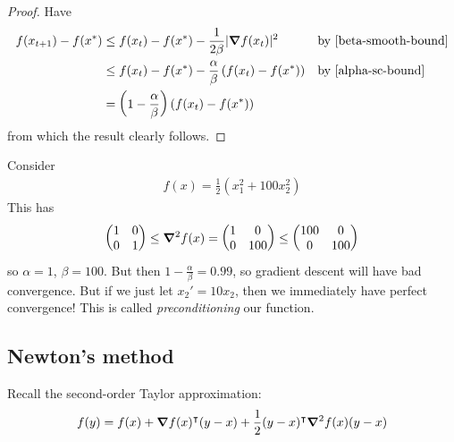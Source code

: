 \documentclass{../../template/note}
\begin{document}
    \begin{proof}
        Have
        \begin{align*}
            f(x_{t+1}) - f(x^*) &\leq f(x_t) - f(x^*) - \frac 1 {2\beta} |\grad f(x_t)|^2 && \text{by \cref{beta-smooth-bound}} \\
            &\leq f(x_t) - f(x^*) - \frac \alpha \beta \left(f(x_t)-f(x^*)\right) && \text{by \cref{alpha-sc-bound}} \\
            &= \left(1-\frac \alpha\beta\right)\left(f(x_t)-f(x^*)\right)
        \end{align*}
        from which the result clearly follows.        
    \end{proof}
    
    \begin{example}
        Consider
        \begin{align*}
            f(x) = \frac 1 2 (x_1^2 + 100 x_2^2)
        \end{align*}
        This has
        \begin{align*}
            \begin{pmatrix}
                1 & 0 \\
                0 & 1 \\
            \end{pmatrix} \leq \grad^2 f(x) = \begin{pmatrix}
                1 & 0 \\
                0 & 100 \\
            \end{pmatrix}\leq \begin{pmatrix}
                100 & 0 \\
                0 & 100 \\
            \end{pmatrix}
        \end{align*}
        so $\alpha = 1$, $\beta = 100$. But then $1 - \frac \alpha \beta = 0.99$, so gradient descent will have bad convergence. But if we just let $x_2' = 10x_2$, then we immediately have perfect convergence! This is called \emph{preconditioning} our function.       
    \end{example}

    \subsection{Newton's method}
    
    Recall the second-order Taylor approximation:
    \begin{align*}
        f(y) = f(x) + \grad f(x)^\intercal (y-x) + \frac 1 2 (y-x)^\intercal \grad^2 f(x) (y-x)
    \end{align*}
    
\end{document}
